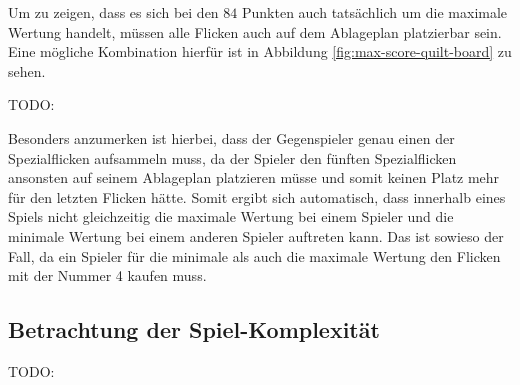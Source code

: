 Um zu zeigen, dass es sich bei den $84$ Punkten auch tatsächlich um die maximale Wertung handelt, müssen alle Flicken auch auf dem Ablageplan platzierbar sein. Eine mögliche Kombination hierfür ist in Abbildung \ref{fig:max-score-quilt-board} zu sehen.


TODO:

Besonders anzumerken ist hierbei, dass der Gegenspieler genau einen der Spezialflicken aufsammeln muss, da der Spieler den fünften Spezialflicken ansonsten auf seinem Ablageplan platzieren müsse und somit keinen Platz mehr für den letzten Flicken hätte. Somit ergibt sich automatisch, dass innerhalb eines Spiels nicht gleichzeitig die maximale Wertung bei einem Spieler und die minimale Wertung bei einem anderen Spieler auftreten kann. Das ist sowieso der Fall, da ein Spieler für die minimale als auch die maximale Wertung den Flicken mit der Nummer 4 kaufen muss.

\subsection*{Betrachtung der Spiel-Komplexität}

TODO:








